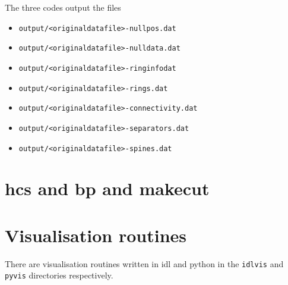 \documentclass[12pt]{article}
\begin{document}
    The three codes output the files 
    \begin{itemize}
      \item \texttt{output/<originaldatafile>-nullpos.dat}
      \item \texttt{output/<originaldatafile>-nulldata.dat}
      \item \texttt{output/<originaldatafile>-ringinfodat}
      \item \texttt{output/<originaldatafile>-rings.dat}
      \item \texttt{output/<originaldatafile>-connectivity.dat}
      \item \texttt{output/<originaldatafile>-separators.dat}
      \item \texttt{output/<originaldatafile>-spines.dat}
    \end{itemize}

  \section{hcs and bp and makecut}

  \section{Visualisation routines}

    There are visualisation routines written in idl and python in the \texttt{idlvis} and \texttt{pyvis} directories respectively.
\end{document}
